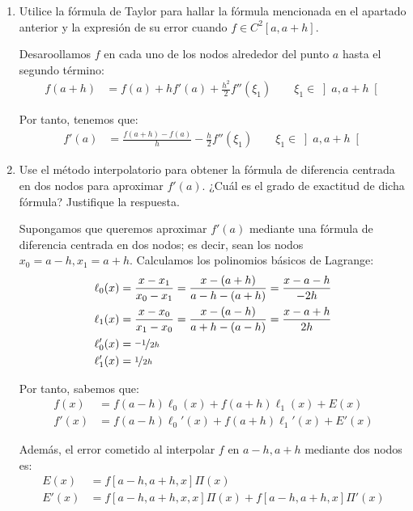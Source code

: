 \begin{ejercicio}
\begin{enumerate}
        Por tanto, sabemos que esta fórmula es exacta en $\bb{P}_1$, pueso que en estos casos se anulará la segunda derivada. No es exacta en $\bb{P}_2$ porque el error no se anula.
        
        \item Utilice la fórmula de Taylor para hallar la fórmula mencionada en el apartado anterior y la expresión de su error cuando $f\in C^2[a, a + h]$.
        
        Desaroollamos $f$ en cada uno de los nodos alrededor del punto $a$ hasta el segundo término:
        \begin{align*}
            f(a+h) &= f(a) + hf'(a) + \frac{h^2}{2}f''(\xi_1)\qquad \xi_1\in\left]a, a+h\right[
        \end{align*}

        Por tanto, tenemos que:
        \begin{align*}
            f'(a) &= \frac{f(a+h) - f(a)}{h} - \frac{h}{2}f''(\xi_1)\qquad \xi_1\in\left]a, a+h\right[
        \end{align*}

        
        \item Use el método interpolatorio para obtener la fórmula de diferencia centrada en dos nodos para aproximar $f'(a)$. ¿Cuál es el grado de exactitud de dicha fórmula? Justifique la respuesta.
        
        Supongamos que queremos aproximar $f'(a)$ mediante una fórmula de diferencia centrada en dos nodos; es decir, sean los nodos $x_0=a-h, x_1=a+h$. Calculamos los polinomios básicos de Lagrange:
        \begin{align*}
            \ell_0(x) &= \frac{x - x_1}{x_0 - x_1} = \frac{x - (a+h)}{a-h - (a+h)} = \frac{x - a - h}{-2h}\\
            \ell_1(x) &= \frac{x - x_0}{x_1 - x_0} = \frac{x - (a-h)}{a+h - (a-h)} = \frac{x - a + h}{2h}\\
            \ell_0'(x) &= \nicefrac{-1}{2h}\\
            \ell_1'(x) &= \nicefrac{1}{2h}
        \end{align*}

        Por tanto, sabemos que:
        \begin{align*}
            f(x) &= f(a-h)\ell_0(x) + f(a+h)\ell_1(x) + E(x)\\
            f'(x) &= f(a-h)\ell_0'(x) + f(a+h)\ell_1'(x) + E'(x)
        \end{align*}

        Además, el error cometido al interpolar $f$ en $a-h, a+h$ mediante dos nodos es:
        \begin{align*}
            E(x) &= f[a-h, a+h, x]\Pi(x)\\
            E'(x) &= f[a-h, a+h, x, x]\Pi(x) + f[a-h, a+h, x]\Pi'(x)
        \end{align*}


\end{enumerate}
\end{ejercicio}
